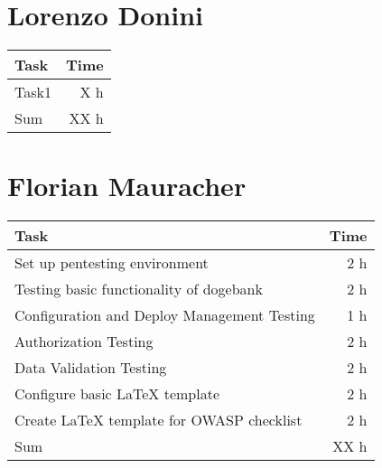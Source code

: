 \clearpage
\section*{Lorenzo Donini}
\begin{table}[h!tpb]
  \centering
  \begin{tabularx}{\textwidth}{X r}
    \toprule
      Task & Time \\
    \midrule
      Task1 & X h \\
    \midrule
      Sum & XX h \\
    \bottomrule
  \end{tabularx}
\end{table}

\clearpage
\section*{Florian Mauracher}
\begin{table}[h!tpb]
  \centering
  \begin{tabularx}{\textwidth}{X r}
    \toprule
      Task & Time \\
    \midrule
      Set up pentesting environment & 2 h \\
      Testing basic functionality of dogebank & 2 h \\
      Configuration and Deploy Management Testing & 1 h \\
      Authorization Testing & 2 h \\
      Data Validation Testing & 2 h \\
      Configure basic \LaTeX{} template & 2 h \\
      Create \LaTeX{} template for OWASP checklist & 2 h \\
    \midrule
      Sum & XX h \\
    \bottomrule
  \end{tabularx}
\end{table}

\clearpage
